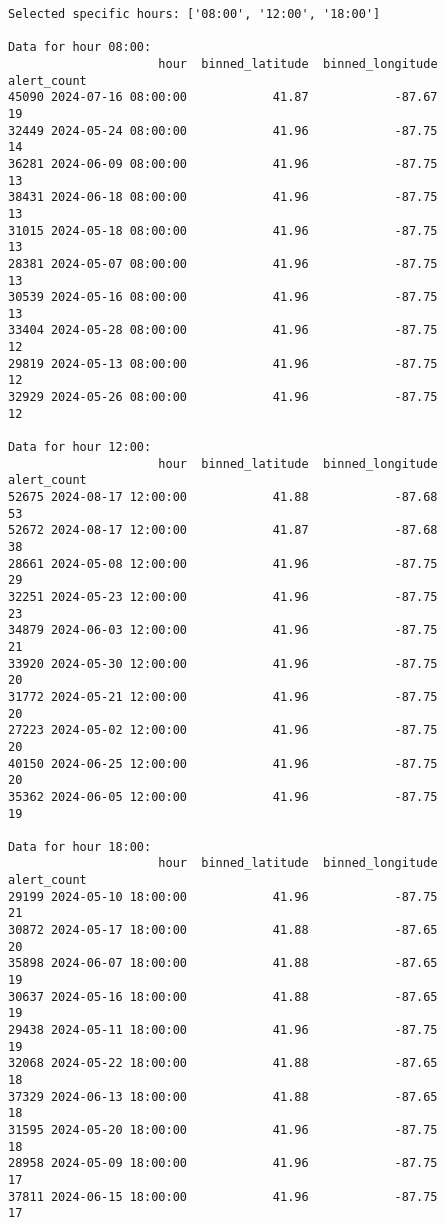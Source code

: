 \documentclass[
  letterpaper,
  DIV=11,
  numbers=noendperiod]{scrartcl}
\begin{document}
\begin{verbatim}
Selected specific hours: ['08:00', '12:00', '18:00']

Data for hour 08:00:
                     hour  binned_latitude  binned_longitude  alert_count
45090 2024-07-16 08:00:00            41.87            -87.67           19
32449 2024-05-24 08:00:00            41.96            -87.75           14
36281 2024-06-09 08:00:00            41.96            -87.75           13
38431 2024-06-18 08:00:00            41.96            -87.75           13
31015 2024-05-18 08:00:00            41.96            -87.75           13
28381 2024-05-07 08:00:00            41.96            -87.75           13
30539 2024-05-16 08:00:00            41.96            -87.75           13
33404 2024-05-28 08:00:00            41.96            -87.75           12
29819 2024-05-13 08:00:00            41.96            -87.75           12
32929 2024-05-26 08:00:00            41.96            -87.75           12

Data for hour 12:00:
                     hour  binned_latitude  binned_longitude  alert_count
52675 2024-08-17 12:00:00            41.88            -87.68           53
52672 2024-08-17 12:00:00            41.87            -87.68           38
28661 2024-05-08 12:00:00            41.96            -87.75           29
32251 2024-05-23 12:00:00            41.96            -87.75           23
34879 2024-06-03 12:00:00            41.96            -87.75           21
33920 2024-05-30 12:00:00            41.96            -87.75           20
31772 2024-05-21 12:00:00            41.96            -87.75           20
27223 2024-05-02 12:00:00            41.96            -87.75           20
40150 2024-06-25 12:00:00            41.96            -87.75           20
35362 2024-06-05 12:00:00            41.96            -87.75           19

Data for hour 18:00:
                     hour  binned_latitude  binned_longitude  alert_count
29199 2024-05-10 18:00:00            41.96            -87.75           21
30872 2024-05-17 18:00:00            41.88            -87.65           20
35898 2024-06-07 18:00:00            41.88            -87.65           19
30637 2024-05-16 18:00:00            41.88            -87.65           19
29438 2024-05-11 18:00:00            41.96            -87.75           19
32068 2024-05-22 18:00:00            41.88            -87.65           18
37329 2024-06-13 18:00:00            41.88            -87.65           18
31595 2024-05-20 18:00:00            41.96            -87.75           18
28958 2024-05-09 18:00:00            41.96            -87.75           17
37811 2024-06-15 18:00:00            41.96            -87.75           17
\end{verbatim}
\end{document}
